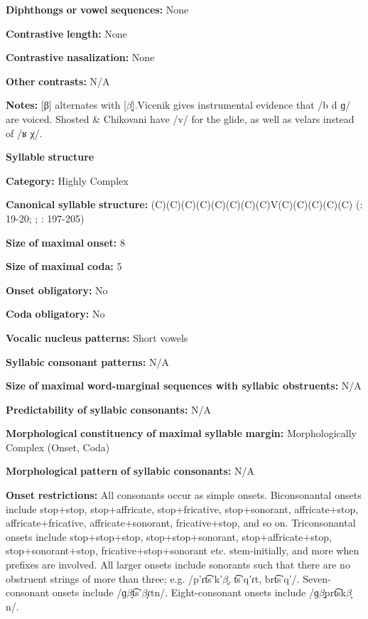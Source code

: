 \begin{styleBody}
\textbf{Diphthongs} \textbf{or} \textbf{vowel} \textbf{sequences:} None

\textbf{Contrastive} \textbf{length:} None

\textbf{Contrastive} \textbf{nasalization:} None

\textbf{Other} \textbf{contrasts:} N/A

\textbf{Notes:} [β] alternates with [$\beta ̞$].Vicenik gives instrumental evidence that /b d ɡ/ are voiced. Shosted \& Chikovani have /v/ for the glide, as well as velars instead of /ʁ χ/.

\textbf{Syllable} \textbf{structure}

\textbf{Category:} Highly Complex

\textbf{Canonical} \textbf{syllable} \textbf{structure:} (C)(C)(C)(C)(C)(C)(C)(C)V(C)(C)(C)(C)(C) (\citealt{Hewitt1995}: 19-20; \citealt{Vogt1958}; \citealt{Butskhrikidze2002}: 197-205)

\textbf{Size} \textbf{of} \textbf{maximal} \textbf{onset:} 8

\textbf{Size} \textbf{of} \textbf{maximal} \textbf{coda:} 5

\textbf{Onset} \textbf{obligatory:} No

\textbf{Coda} \textbf{obligatory:} No

\textbf{Vocalic} \textbf{nucleus} \textbf{patterns:} Short vowels

\textbf{Syllabic} \textbf{consonant} \textbf{patterns:} N/A

\textbf{Size} \textbf{of} \textbf{maximal} \textbf{word{}-marginal sequences with syllabic obstruents:} N/A

\textbf{Predictability} \textbf{of} \textbf{syllabic} \textbf{consonants:} N/A

\textbf{Morphological} \textbf{constituency} \textbf{of} \textbf{maximal} \textbf{syllable} \textbf{margin:} Morphologically Complex (Onset, Coda)

\textbf{Morphological} \textbf{pattern} \textbf{of} \textbf{syllabic} \textbf{consonants:} N/A

\textbf{Onset} \textbf{restrictions:} All consonants occur as simple onsets. Biconsonantal onsets include stop+stop, stop+affricate, stop+fricative, stop+sonorant, affricate+stop, affricate+fricative, affricate+sonorant, fricative+stop, and so on. Triconsonantal onsets include stop+stop+stop, stop+stop+sonorant, stop+affricate+stop, stop+sonorant+stop, fricative+stop+sonorant etc. stem-initially, and more when prefixes are involved. All larger onsets include sonorants such that there are no obstruent strings of more than three; e.g. /p’ɾt͡s’k'$\beta ̞$, t͡s’q’ɾt, brt͡s'q{}'/. Seven-consonant onsets include /ɡ$\beta ̞$t͡s’$\beta ̞ɾ$tn/. Eight-consonant onsets include /ɡ$\beta ̞$prt͡sk$\beta ̞$n/.


\end{styleBody}
